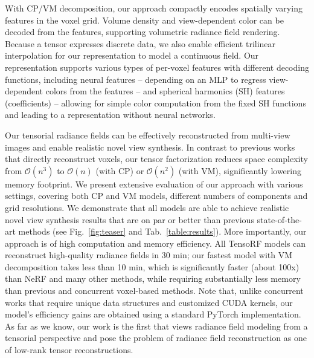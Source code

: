 \documentclass[runningheads]{llncs}
\begin{document}
With CP/VM decomposition, our approach compactly encodes spatially varying features in the voxel grid. Volume density and view-dependent color can be decoded from the features, supporting volumetric radiance field rendering. Because a tensor expresses discrete data, we also enable efficient trilinear interpolation for our representation to model a continuous field.
Our representation supports various types of per-voxel features with different decoding functions, including neural features -- depending on an MLP to regress view-dependent colors from the features -- and spherical harmonics (SH) features (coefficients) -- allowing for simple color computation from the fixed SH functions and leading to a representation without neural networks.

Our tensorial radiance fields can be effectively reconstructed from multi-view images and enable realistic novel view synthesis.
In contrast to previous works that directly reconstruct voxels, our tensor factorization reduces space complexity from $\mathcal{O}(n^3)$ to $\mathcal{O}(n)$ (with CP) or $\mathcal{O}(n^2)$ (with VM), significantly lowering memory footprint. 
We present extensive evaluation of our approach with various settings, covering both CP and VM models, different numbers of components and grid resolutions. 
We demonstrate that all models are able to achieve realistic novel view synthesis results that are on par or better than previous state-of-the-art methods (see Fig.~\ref{fig:teaser} and Tab.~\ref{table:results}).
More importantly, our approach is of high computation and memory efficiency.
All TensoRF models can reconstruct high-quality radiance fields in 30 min; our fastest model with VM decomposition takes less than 10 min, which is significantly faster (about 100x) than NeRF and many other methods, while requiring substantially less memory than previous and concurrent voxel-based methods.
Note that, unlike concurrent works \cite{yu2021plenoxels,muller2022instant} that require unique data structures and customized CUDA kernels, our model's efficiency gains are obtained using a standard PyTorch implementation. 
As far as we know, our work is the first that views radiance field modeling from a tensorial perspective and pose the problem of radiance field reconstruction as one of low-rank tensor reconstructions. 
\end{document}
